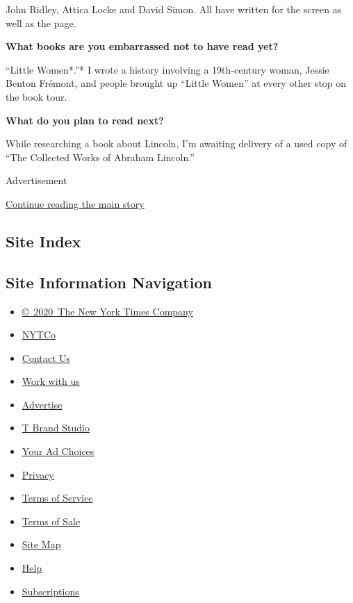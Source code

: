 John Ridley, Attica Locke and David Simon. All have written for the
screen as well as the page.

\textbf{What books are you embarrassed not to have read yet?}

``Little Women*.''* I wrote a history involving a 19th-century woman,
Jessie Benton Frémont, and people brought up ``Little Women'' at every
other stop on the book tour.

\textbf{What do you plan to read next?}

While researching a book about Lincoln, I'm awaiting delivery of a used
copy of ``The Collected Works of Abraham Lincoln.''

Advertisement

\protect\hyperlink{after-bottom}{Continue reading the main story}

\hypertarget{site-index}{%
\subsection{Site Index}\label{site-index}}

\hypertarget{site-information-navigation}{%
\subsection{Site Information
Navigation}\label{site-information-navigation}}

\begin{itemize}
\tightlist
\item
  \href{https://help.nytimes3xbfgragh.onion/hc/en-us/articles/115014792127-Copyright-notice}{©~2020~The
  New York Times Company}
\end{itemize}

\begin{itemize}
\tightlist
\item
  \href{https://www.nytco.com/}{NYTCo}
\item
  \href{https://help.nytimes3xbfgragh.onion/hc/en-us/articles/115015385887-Contact-Us}{Contact
  Us}
\item
  \href{https://www.nytco.com/careers/}{Work with us}
\item
  \href{https://nytmediakit.com/}{Advertise}
\item
  \href{http://www.tbrandstudio.com/}{T Brand Studio}
\item
  \href{https://www.nytimes3xbfgragh.onion/privacy/cookie-policy\#how-do-i-manage-trackers}{Your
  Ad Choices}
\item
  \href{https://www.nytimes3xbfgragh.onion/privacy}{Privacy}
\item
  \href{https://help.nytimes3xbfgragh.onion/hc/en-us/articles/115014893428-Terms-of-service}{Terms
  of Service}
\item
  \href{https://help.nytimes3xbfgragh.onion/hc/en-us/articles/115014893968-Terms-of-sale}{Terms
  of Sale}
\item
  \href{https://spiderbites.nytimes3xbfgragh.onion}{Site Map}
\item
  \href{https://help.nytimes3xbfgragh.onion/hc/en-us}{Help}
\item
  \href{https://www.nytimes3xbfgragh.onion/subscription?campaignId=37WXW}{Subscriptions}
\end{itemize}
